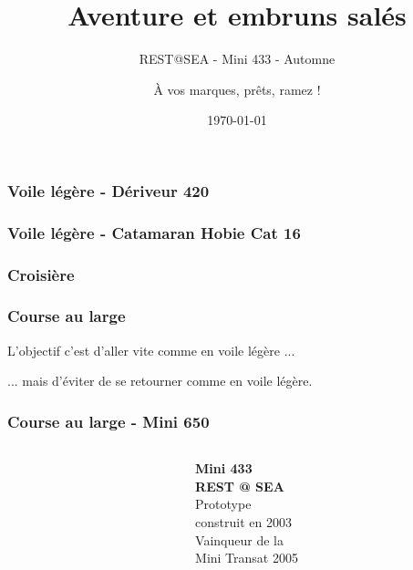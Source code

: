 \documentclass{beamer}
\title[Course au large]{Aventure et embruns salés}
\subtitle{REST@SEA - Mini 433 - Automne \the\year}
\author{À vos marques, prêts, ramez !}
\institute{Rémy Hubscher}
\date{\today}
\begin{document}

\begin{frame}[plain]
  \titlepage
\end{frame}

\begin{frame}
  \frametitle{Voile légère - Dériveur 420}

  
\end{frame}

\begin{frame}
  \frametitle{Voile légère - Catamaran Hobie Cat 16}

  
\end{frame}

\begin{frame}
  \frametitle{Croisière}

  
\end{frame}

\begin{frame}
  \frametitle{Course au large}

  L'objectif c'est d'aller vite comme en voile légère ... \pause

  \vspace{6em}

  ... mais d'éviter de se retourner comme en voile légère.
  
\end{frame}

\begin{frame}
  \frametitle{Course au large - Mini 650}

  \begin{columns}
    \begin{column}{0.6\textwidth}
      \begin{center}
      \end{center}
    \end{column}
    \begin{column}{0.4\textwidth}
      \begin{center}
        \textbf{Mini 433} \\
        \vspace{1em}
        \pause \textbf{REST @ SEA} \\
        \vspace{1em}
        \pause Prototype \\ construit en 2003 \\
        \vspace{1em}
        \pause Vainqueur de la \\ Mini Transat 2005
        \vspace{6em}
      \end{center}
    \end{column}
  \end{columns}
\end{frame}
\end{document}
